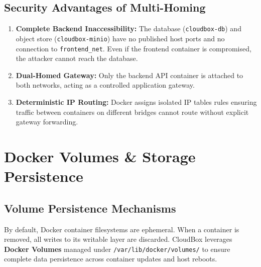 \documentclass[11pt,a4paper]{report}
\begin{document}
\section{Security Advantages of Multi-Homing}
\begin{enumerate}[itemsep=1pt,topsep=1pt]
    \item \textbf{Complete Backend Inaccessibility:} The database (\texttt{cloudbox-db}) and object store (\texttt{cloudbox-minio}) have no published host ports and no connection to \texttt{frontend\_net}. Even if the frontend container is compromised, the attacker cannot reach the database.
    \item \textbf{Dual-Homed Gateway:} Only the backend API container is attached to both networks, acting as a controlled application gateway.
    \item \textbf{Deterministic IP Routing:} Docker assigns isolated IP tables rules ensuring traffic between containers on different bridges cannot route without explicit gateway forwarding.
\end{enumerate}

\clearpage

\chapter{Docker Volumes \& Storage Persistence}

\section{Volume Persistence Mechanisms}
By default, Docker container filesystems are ephemeral. When a container is removed, all writes to its writable layer are discarded. CloudBox leverages \textbf{Docker Volumes} managed under \texttt{/var/lib/docker/volumes/} to ensure complete data persistence across container updates and host reboots.
\end{document}
